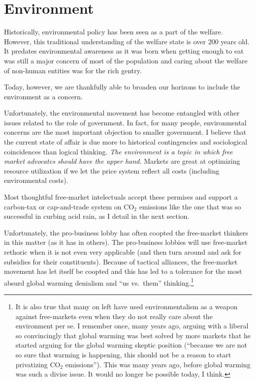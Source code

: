 \chapter{Environment}
\label{chpt:environment}

Historically, environmental policy has been seen as a part of the welfare.
However, this traditional understanding of the welfare state is over 200 years
old. It predates environmental awareness as it was born when getting enough to
eat was still a major concern of most of the population and caring about the
welfare of non-human entities was for the rich gentry.

Today, however, we are thankfully able to broaden our horizons to include the
environment as a concern.

Unfortunately, the environmental movement has become entangled with other
issues related to the role of government.  In fact, for many people,
environmental concerns are the most important objection to smaller government.
I believe that the current state of affair is due more to historical
contingencies and sociological coincidences than logical thinking. \emph{The
environment is a topic in which free market advocates should have the upper
hand.} Markets are great at optimizing resource utilization if we let the price
system reflect all costs (including environmental costs).

Most thoughtful free-market intelectuals accept these permises and support a
carbon-tax or cap-and-trade system on CO$_2$ emissions like the one that was so
successful in curbing acid rain, as I detail in the next section.

Unfortunately, the pro-business lobby has often coopted the free-market
thinkers in this matter (as it has in others). The pro-business lobbies will
use free-market rethoric when it is not even very applicable (and then turn
around and ask for subsidies for their constituents). Because of tactical
alliances, the free-market movement has let itself be coopted and this has led
to a tolerance for the most absurd global warming denialism and ``us vs.\
them'' thinking.\footnote{It is also true that many on left have used
environmentalism as a weapon against free-markets even when they do not really
care about the environment per se. I remember once, many years ago, arguing
with a liberal so convincingly that global warming was best solved by more
markets that he started arguing for the global warming skeptic position
(``because we are not so sure that warming is happening, this should not be a
reason to start privatizing CO${}_2$ emissions''). This was many years ago,
before global warming was such a divise issue. It would no longer be possible
today, I think.}

